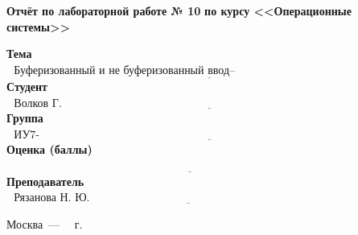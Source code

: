 \begin{titlepage}
	\begin{center}
		\Large\textbf{Отчёт по лабораторной работе № 10}
		\Large\textbf{по курсу <<Операционные системы>>}
	\end{center}

	\noindent\textbf{Тема} $\underline{\text{~~Буферизованный и не буферизованный ввод--вывод~~~~~~~~~~~~~~~~~~~~~~~~~~~~~~~~~~~~~~~~~}}$\newline\newline
	\noindent\textbf{Студент} $\underline{\text{~~Волков Г. В.~~~~~~~~~~~~~~~~~~~~~~~~~~~~~~~~~~~~~~~~~~~~~~~~~~~~~~~~~~~~~~~~~~~~~~~~~~~~~~~~~~~~~~~~~~}}$\newline\newline
	\noindent\textbf{Группа} $\underline{\text{~~ИУ7-61Б~~~~~~~~~~~~~~~~~~~~~~~~~~~~~~~~~~~~~~~~~~~~~~~~~~~~~~~~~~~~~~~~~~~~~~~~~~~~~~~~~~~~~~~~~~~~~~~~~}}$\newline\newline
	\noindent\textbf{Оценка (баллы)} $\underline{\text{~~~~~~~~~~~~~~~~~~~~~~~~~~~~~~~~~~~~~~~~~~~~~~~~~~~~~~~~~~~~~~~~~~~~~~~~~~~~~~~~~~~~~~~~~~~~~~~~~~}}$\newline\newline
	\noindent\textbf{Преподаватель} $\underline{\text{~~Рязанова Н. Ю. ~~~~~~~~~~~~~~~~~~~~~~~~~~~~~~~~~~~~~~~~~~~~~~~~~~~~~~~~~~~~~~~~~~~~~~~~~~}}$\newline

	\begin{center}
		\vfill
		Москва~---~\the\year
		~г.
	\end{center}
	\restoregeometry
\end{titlepage}

